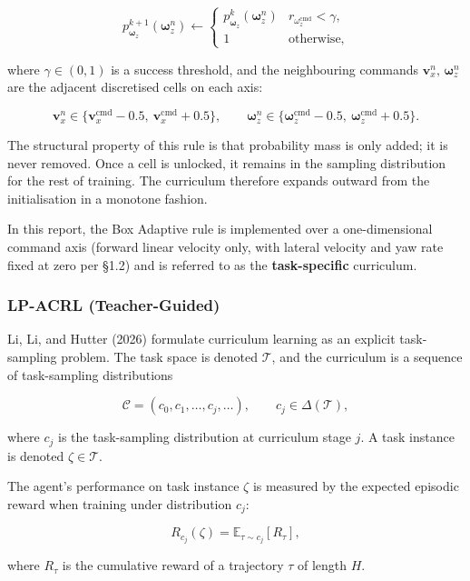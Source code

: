 \[
p_{\boldsymbol{\omega}_z}^{k+1}(\boldsymbol{\omega}_z^n) \leftarrow
\begin{cases}
p_{\boldsymbol{\omega}_z}^{k}(\boldsymbol{\omega}_z^n) & r_{\omega_z^{\mathrm{cmd}}} < \gamma, \\
1 & \text{otherwise},
\end{cases} \tag{10b}
\]

where $\gamma \in (0, 1)$ is a success threshold, and the neighbouring commands $\mathbf{v}_x^n,\, \boldsymbol{\omega}_z^n$ are the adjacent discretised cells on each axis:

\[
\mathbf{v}_x^n \in \{\mathbf{v}_x^{\mathrm{cmd}} - 0.5,\ \mathbf{v}_x^{\mathrm{cmd}} + 0.5\}, \qquad
\boldsymbol{\omega}_z^n \in \{\boldsymbol{\omega}_z^{\mathrm{cmd}} - 0.5,\ \boldsymbol{\omega}_z^{\mathrm{cmd}} + 0.5\}.
\]

The structural property of this rule is that probability mass is only added; it is never removed. Once a cell is unlocked, it remains in the sampling distribution for the rest of training. The curriculum therefore expands outward from the initialisation in a monotone fashion.

In this report, the Box Adaptive rule is implemented over a one-dimensional command axis (forward linear velocity only, with lateral velocity and yaw rate fixed at zero per \S1.2) and is referred to as the \textbf{task-specific} curriculum.

\subsubsection{LP-ACRL (Teacher-Guided)}

Li, Li, and Hutter (2026) formulate curriculum learning as an explicit task-sampling problem. The task space is denoted $\mathcal{T}$, and the curriculum is a sequence of task-sampling distributions

\[
\mathcal{C} = (c_0, c_1, \ldots, c_j, \ldots), \qquad c_j \in \Delta(\mathcal{T}), \tag{1}
\]

where $c_j$ is the task-sampling distribution at curriculum stage $j$. A task instance is denoted $\zeta \in \mathcal{T}$.

The agent's performance on task instance $\zeta$ is measured by the expected episodic reward when training under distribution $c_j$:

\[
R_{c_j}(\zeta) = \mathbb{E}_{\tau \sim c_j}\!\left[ R_\tau \right], \tag{5}
\]

where $R_\tau$ is the cumulative reward of a trajectory $\tau$ of length $H$.

